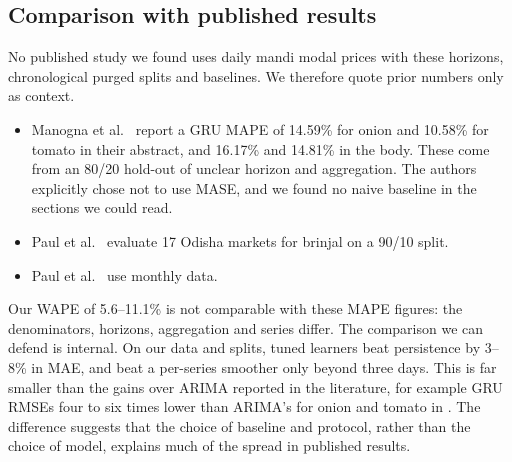 

\subsection{Comparison with published results}\label{sec:comparison}
No published study we found uses daily mandi modal prices with these horizons, chronological purged splits and baselines.
We therefore quote prior numbers only as context.
\begin{itemize}
  \item Manogna et al.\ \cite{manogna2025deep} report a GRU MAPE of 14.59\% for onion and 10.58\% for tomato in their abstract, and 16.17\% and 14.81\% in the body.
    These come from an 80/20 hold-out of unclear horizon and aggregation. The authors explicitly chose not to use MASE, and we found no naive baseline in the sections we could read.
  \item Paul et al.\ \cite{paul2022brinjal} evaluate 17 Odisha markets for brinjal on a 90/10 split.
  \item Paul et al.\ \cite{paul2025deep} use monthly data.
\end{itemize}
Our WAPE of 5.6--11.1\% is not comparable with these MAPE figures: the denominators, horizons, aggregation and series differ.
The comparison we can defend is internal. On our data and splits, tuned learners beat persistence by 3--8\% in MAE, and beat a per-series smoother only beyond three days.
This is far smaller than the gains over ARIMA reported in the literature, for example GRU RMSEs four to six times lower than ARIMA's for onion and tomato in \cite{manogna2025deep}.
The difference suggests that the choice of baseline and protocol, rather than the choice of model, explains much of the spread in published results.
